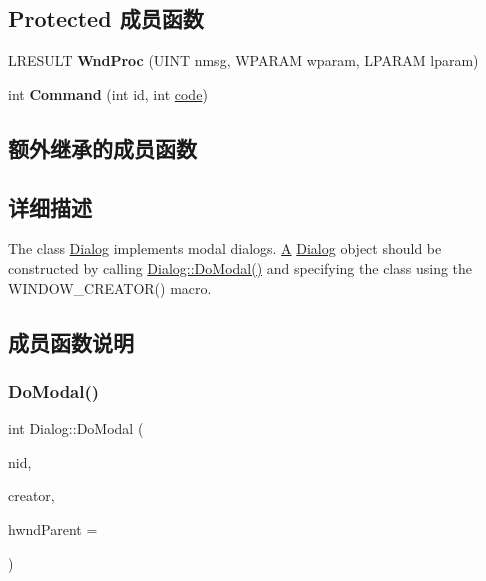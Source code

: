 \subsection*{Protected 成员函数}
\begin{DoxyCompactItemize}
\item 
\mbox{\label{struct_dialog_af66b0bf35da9b2058a88ff84b60155fd}} 
L\+R\+E\+S\+U\+LT {\bfseries Wnd\+Proc} (U\+I\+NT nmsg, W\+P\+A\+R\+AM wparam, L\+P\+A\+R\+AM lparam)
\item 
\mbox{\label{struct_dialog_afc104d0dbd615555f1b61f705d3f816a}} 
int {\bfseries Command} (int id, int \hyperlink{structcode}{code})
\end{DoxyCompactItemize}
\subsection*{额外继承的成员函数}


\subsection{详细描述}
The class \hyperlink{struct_dialog}{Dialog} implements modal dialogs. \hyperlink{struct_a}{A} \hyperlink{struct_dialog}{Dialog} object should be constructed by calling \hyperlink{struct_dialog_a68e10e3226c95864b8570595adc6a39c}{Dialog\+::\+Do\+Modal()} and specifying the class using the W\+I\+N\+D\+O\+W\+\_\+\+C\+R\+E\+A\+T\+O\+R() macro. 

\subsection{成员函数说明}
\mbox{\label{struct_dialog_a68e10e3226c95864b8570595adc6a39c}} 
\subsubsection{\texorpdfstring{Do\+Modal()}{DoModal()}\hspace{0.1cm}{\footnotesize\ttfamily [1/2]}}
{\footnotesize\ttfamily int Dialog\+::\+Do\+Modal (\begin{DoxyParamCaption}\item[{U\+I\+NT}]{nid,  }\item[{C\+R\+E\+A\+T\+O\+R\+F\+U\+NC}]{creator,  }\item[{\hyperlink{interfacevoid}{H\+W\+ND}}]{hwnd\+Parent = {} }\end{DoxyParamCaption})\hspace{0.3cm}{\ttfamily [static]}}

